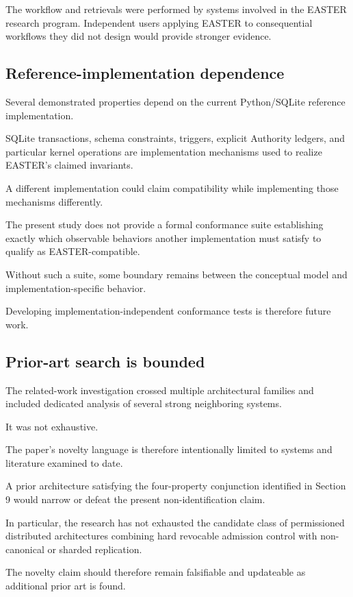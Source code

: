 \documentclass[11pt]{article}
\begin{document}
The workflow and retrievals were performed by systems involved in the EASTER research program. Independent users applying EASTER to consequential workflows they did not design would provide stronger evidence.

\subsection{Reference-implementation dependence}

Several demonstrated properties depend on the current Python/SQLite reference implementation.

SQLite transactions, schema constraints, triggers, explicit Authority ledgers, and particular kernel operations are implementation mechanisms used to realize EASTER's claimed invariants.

A different implementation could claim compatibility while implementing those mechanisms differently.

The present study does not provide a formal conformance suite establishing exactly which observable behaviors another implementation must satisfy to qualify as EASTER-compatible.

Without such a suite, some boundary remains between the conceptual model and implementation-specific behavior.

Developing implementation-independent conformance tests is therefore future work.

\subsection{Prior-art search is bounded}

The related-work investigation crossed multiple architectural families and included dedicated analysis of several strong neighboring systems.

It was not exhaustive.

The paper's novelty language is therefore intentionally limited to systems and literature examined to date.

A prior architecture satisfying the four-property conjunction identified in Section 9 would narrow or defeat the present non-identification claim.

In particular, the research has not exhausted the candidate class of permissioned distributed architectures combining hard revocable admission control with non-canonical or sharded replication.

The novelty claim should therefore remain falsifiable and updateable as additional prior art is found.
\end{document}
